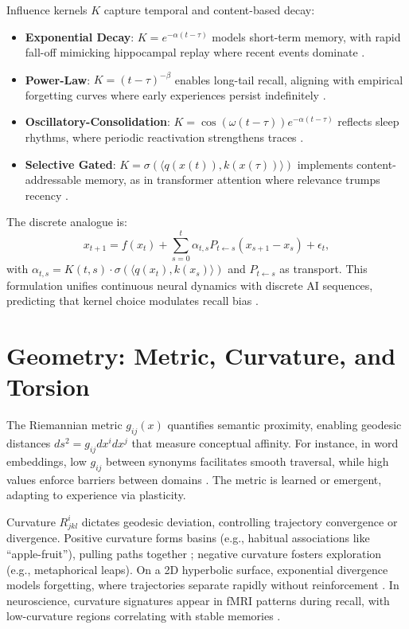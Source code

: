 \documentclass[a4paper,12pt]{article}
\begin{document}
Influence kernels $K$ capture temporal and content-based decay:
\begin{itemize}
    \item \textbf{Exponential Decay}: $K = e^{-\alpha (t-\tau)}$ models short-term memory, with rapid fall-off mimicking hippocampal replay where recent events dominate \citep{hassabis2007patients}.
    \item \textbf{Power-Law}: $K = (t-\tau)^{-\beta}$ enables long-tail recall, aligning with empirical forgetting curves where early experiences persist indefinitely \citep{mcclelland1995why}.
    \item \textbf{Oscillatory-Consolidation}: $K = \cos(\omega (t-\tau)) e^{-\alpha (t-\tau)}$ reflects sleep rhythms, where periodic reactivation strengthens traces \citep{stickgold2005sleep}.
    \item \textbf{Selective Gated}: $K = \sigma(\langle q(x(t)), k(x(\tau)) \rangle)$ implements content-addressable memory, as in transformer attention where relevance trumps recency \citep{vaswani2017attention}.
\end{itemize}
The discrete analogue is:
\[
x_{t+1} = f(x_t) + \sum_{s=0}^t \alpha_{t,s} P_{t \leftarrow s} (x_{s+1} - x_s) + \epsilon_t,
\]
with $\alpha_{t,s} = K(t,s) \cdot \sigma(\langle q(x_t), k(x_s) \rangle)$ and $P_{t \leftarrow s}$ as transport. This formulation unifies continuous neural dynamics with discrete AI sequences, predicting that kernel choice modulates recall bias \citep{oliver2017hippocampal}.

\section{Geometry: Metric, Curvature, and Torsion}
The Riemannian metric $g_{ij}(x)$ quantifies semantic proximity, enabling geodesic distances $ds^2 = g_{ij} dx^i dx^j$ that measure conceptual affinity. For instance, in word embeddings, low $g_{ij}$ between synonyms facilitates smooth traversal, while high values enforce barriers between domains \citep{edelman1998representation}. The metric is learned or emergent, adapting to experience via plasticity.

Curvature $R^i_{jkl}$ dictates geodesic deviation, controlling trajectory convergence or divergence. Positive curvature forms basins (e.g., habitual associations like ``apple-fruit''), pulling paths together \citep{penrose1989road}; negative curvature fosters exploration (e.g., metaphorical leaps). On a 2D hyperbolic surface, exponential divergence models forgetting, where trajectories separate rapidly without reinforcement \citep{heusser2018geometric}. In neuroscience, curvature signatures appear in fMRI patterns during recall, with low-curvature regions correlating with stable memories \citep{hassabis2007patients}.
\end{document}
